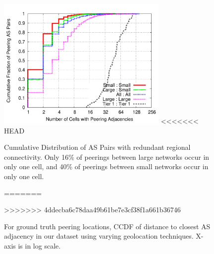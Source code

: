 \begin{figure}[tb]
\centering
\includegraphics[width=3.25in]{peering}
<<<<<<< HEAD
\caption[]{\label{fig:peering_redundancy} Cumulative Distribution of AS Pairs with redundant regional connectivity. Only 16\% of peerings between large networks occur in only one cell, and 40\% of peerings between small networks occur in only one cell.} 
=======
\caption[]{For ground truth peering locations, CCDF of distance to closest AS
adjacency in our dataset using varying geolocation techniques. X-axis is in log
scale.} 
>>>>>>> 4ddecba6c78daa49b61be7e3cf38f1a661b36746
\end{figure}

